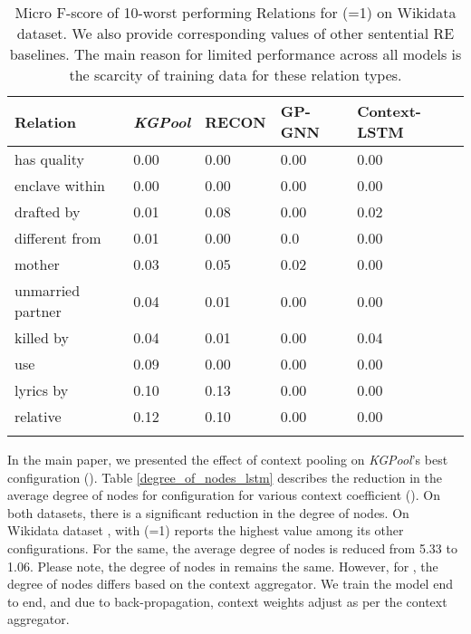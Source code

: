 \documentclass[11pt,a4paper]{article}
\newlength\Origarrayrulewidth
\newcommand{\Cline}[1]{\noalign{\global\setlength\Origarrayrulewidth{\arrayrulewidth}}\noalign{\global\setlength\arrayrulewidth{1.1pt}}\cline{#1}\noalign{\global\setlength\arrayrulewidth{\Origarrayrulewidth}}}
\begin{document}
\begin{table*}[!htbp]
\small
    \centering
    \begin{tabular}{p{3.0 cm}|p{1.5cm}|p{1.5cm}|p{1.5cm}|p{3.1cm}}
        \Cline{1-5}
        \textbf{Relation} & \textbf{\textit{KGPool}}  &  \textbf{RECON}   & \textbf{GP-GNN} & \textbf{Context-LSTM} \\
        \hline
has quality   & 0.00 & 0.00 & 0.00 & 0.00\\
        enclave within   & 0.00 & 0.00 & 0.00 & 0.00 \\
          drafted by  & 0.01 & 0.08 & 0.00 & 0.02 \\
           different from  & 0.01 & 0.00& 0.0 & 0.00\\
           mother  & 0.03 & 0.05 & 0.02 & 0.00\\
          unmarried partner & 0.04 & 0.01 & 0.00 & 0.00\\
           killed by & 0.04 & 0.01 & 0.00& 0.04\\
           use & 0.09 & 0.00 & 0.00 & 0.00\\
           lyrics by & 0.10 & 0.13 & 0.00 & 0.00\\
          relative & 0.12 & 0.10 & 0.00 & 0.00\\
\hline
\Cline{1-5}
    \end{tabular}
    \caption{Micro F-score of 10-worst performing Relations for  (=1) on Wikidata dataset. We also provide corresponding values of other sentential RE baselines. The main reason for limited performance across all models is the scarcity of training data for these relation types.}
    \label{worst}
    \vspace{-3mm}
\end{table*}

In the main paper, we presented the effect of context pooling on \textit{KGPool}'s best configuration (). Table \ref{degree_of_nodes_lstm} describes the reduction in the average degree of nodes for  configuration for various context coefficient (). On both datasets, there is a significant reduction in the degree of nodes. On Wikidata dataset \cite{DBLP:conf/emnlp/SorokinG17},  with 
(=1) reports the highest value among its other configurations. For the same, the average degree of nodes is reduced from 5.33 to 1.06. Please note, the degree of nodes in  remains the same. However, for , the degree of nodes differs based on the context aggregator. We train the model end to end, and due to back-propagation, context weights adjust as per the context aggregator. 
\end{document}
